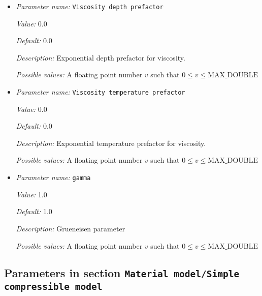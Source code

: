 \begin{itemize}
{\it Value:} false


{\it Default:} false


{\it Description:} Whether to use the TALA instead of the ALA approximation.


{\it Possible values:} A boolean value (true or false)
\item {\it Parameter name:} {\tt Viscosity depth prefactor}
\label{parameters:Material model/Nondimensional model/Viscosity depth prefactor}


{\it Value:} 0.0


{\it Default:} 0.0


{\it Description:} Exponential depth prefactor for viscosity.


{\it Possible values:} A floating point number $v$ such that $0 \leq v \leq \text{MAX\_DOUBLE}$
\item {\it Parameter name:} {\tt Viscosity temperature prefactor}
\label{parameters:Material model/Nondimensional model/Viscosity temperature prefactor}


{\it Value:} 0.0


{\it Default:} 0.0


{\it Description:} Exponential temperature prefactor for viscosity.


{\it Possible values:} A floating point number $v$ such that $0 \leq v \leq \text{MAX\_DOUBLE}$
\item {\it Parameter name:} {\tt gamma}
\label{parameters:Material model/Nondimensional model/gamma}


{\it Value:} 1.0


{\it Default:} 1.0


{\it Description:} Grueneisen parameter


{\it Possible values:} A floating point number $v$ such that $0 \leq v \leq \text{MAX\_DOUBLE}$
\end{itemize}

\subsection{Parameters in section \tt Material model/Simple compressible model}
\label{parameters:Material_20model/Simple_20compressible_20model}

